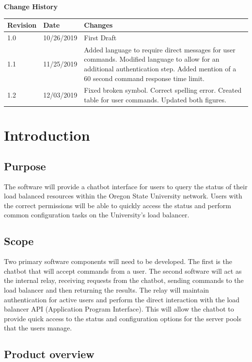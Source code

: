 \documentclass[onecolumn, draftclsnofoot,10pt, compsoc]{IEEEtran}
\begin{document}
\textbf{Change History}\par

\begin{tabular}{ p{1in} p{1in} p{4in} }
 \textbf{Revision} & \textbf{Date} & \textbf{Changes} \\
 \hline
 1.0 & 10/26/2019 
 & First Draft \\
 \hline
 1.1 & 11/25/2019 
 & Added language to require direct messages for user commands. Modified language to allow for an additional authentication step. Added mention of a 60 second command response time limit.\\
 \hline
 1.2 & 12/03/2019
 & Fixed broken symbol. Correct spelling error. Created table for user commands. Updated both figures.
\end{tabular}

\clearpage

\section{Introduction}
\subsection{Purpose}
 The software will provide a chatbot interface for users to query the status of their load balanced resources within the Oregon State University network.
 Users with the correct permissions will be able to quickly access the status and perform common configuration tasks on the University's load balancer.
 
\subsection{Scope}
Two primary software components will need to be developed.
The first is the chatbot that will accept commands from a user.
The second software will act as the internal relay, receiving requests from the chatbot, sending commands to the load balancer and then returning the results.
The relay will maintain authentication for active users and perform the direct interaction with the load balancer API (Application Program Interface).
This will allow the chatbot to provide quick access to the status and configuration options for the server pools that the users manage.

\subsection{Product overview}
\end{document}
